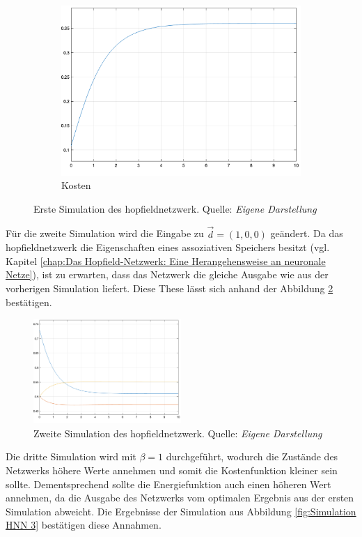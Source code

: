 \begin{figure}[h]
\begin{subfigure}[b]{0.32\textwidth}
    \includegraphics[width=\textwidth]{abbildungen/hnn_simulation_1_kostenfunktion.png}
    \caption{Kosten}
  \end{subfigure}
  \caption{Erste Simulation des \gls{hopfieldnetzwerk}. Quelle: \textit{Eigene Darstellung}}
  \label{fig:Simulation HNN 1}
\end{figure}

Für die zweite Simulation wird die Eingabe zu \(\vec{d}=(1,0,0)\) geändert. Da das \gls{hopfieldnetzwerk} die Eigenschaften eines assoziativen Speichers besitzt (vgl. Kapitel \ref{chap:Das Hopfield-Netzwerk: Eine Herangehensweise an neuronale Netze}), ist zu erwarten, dass das Netzwerk die gleiche Ausgabe wie aus der vorherigen Simulation liefert. Diese These lässt sich anhand der Abbildung \ref{fig:Simulation HNN 2} bestätigen.

\begin{figure}[h]
  \centering
  \includegraphics[width=0.5\textwidth]{abbildungen/hnn_simulation_2_ausgabe.png}
  \caption{Zweite Simulation des \gls{hopfieldnetzwerk}. Quelle: \textit{Eigene Darstellung}}
  \label{fig:Simulation HNN 2}
\end{figure}

Die dritte Simulation wird mit \(\beta=1\) durchgeführt, wodurch die Zustände des Netzwerks höhere Werte annehmen und somit die Kostenfunktion kleiner sein sollte. Dementsprechend sollte die Energiefunktion auch einen höheren Wert annehmen, da die Ausgabe des Netzwerks vom optimalen Ergebnis aus der ersten Simulation abweicht. Die Ergebnisse der Simulation aus Abbildung \ref{fig:Simulation HNN 3} bestätigen diese Annahmen.

